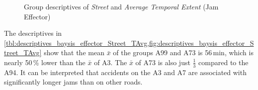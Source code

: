 \begin{figure}[ht!]
\begin{minipage}{0.55\textwidth}
		\tiny
		\centering
		\vfill
		\label{fig:descriptives_baysis_effector_Street_TAvg}
	\end{minipage}%
	\caption{Group descriptives of \textit{Street} and \textit{Average Temporal Extent} (Jam Effector)}
\end{figure}
The descriptives in \cref{tbl:descriptives_baysis_effector_Street_TAvg,fig:descriptives_baysis_effector_Street_TAvg} show that the mean $\bar{x}$ of the groups A99 and A73 is 56\,min, which is nearly 50\,\% lower than the $\bar{x}$ of A3. The $\bar{x}$ of A73 is also just $\frac{1}{3}$ compared to the A94. It can be interpreted that accidents on the A3 and A7 are associated with significantly longer jams than on other roads.

